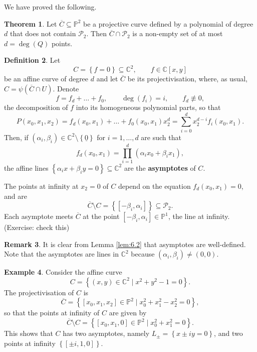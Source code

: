 \documentclass{article}
\newcommand{\C}{\mathbb{C}}
\renewcommand{\P}{\mathbb{P}}
\newcommand{\rb}[1]{\left( #1 \right)}
\renewcommand{\sb}[1]{\left[ #1 \right]}
\newcommand{\cb}[1]{\left\{ #1 \right\}}
\theoremstyle{definition}\newtheorem{definition}{Definition}[section]
\theoremstyle{definition}\newtheorem{notation}[definition]{Notation}
\theoremstyle{definition}\newtheorem{remark}[definition]{Remark}
\theoremstyle{definition}\newtheorem{example1}[definition]{Example}
\theoremstyle{definition}\newtheorem{fact}{Fact}
\theoremstyle{definition}\newtheorem{exercise}{Exercise}
\theoremstyle{definition}\newtheorem*{example2}{Example}
\newtheorem{theorem}[definition]{Theorem}
\begin{document}
We have proved the following.

\begin{theorem}
Let $ \overline{C} \subseteq \P^2 $ be a projective curve defined by a polynomial of degree $ d $ that does not contain $ \mathcal{P}_2 $. Then $ \overline{C} \cap \mathcal{P}_2 $ is a non-empty set of at most $ d = \deg\rb{Q} $ points.
\end{theorem}

\begin{definition}
Let
$$ C = \cb{f = 0} \subseteq \C^2, \qquad f \in \C\sb{x, y} $$
be an affine curve of degree $ d $ and let $ \overline{C} $ be its projectivisation, where, as usual, $ C = \psi\rb{\overline{C} \cap U} $. Denote
$$ f = f_d + \dots + f_0, \qquad \deg\rb{f_i} = i, \qquad f_d \not\equiv 0, $$
the decomposition of $ f $ into its homogeneous polynomial parts, so that
$$ P\rb{x_0, x_1, x_2} = f_d\rb{x_0, x_1} + \dots + f_0\rb{x_0, x_1}x_2^d = \sum_{i = 0}^d x_2^{d - i}f_i\rb{x_0, x_1}. $$
Then, if $ \rb{\alpha_i, \beta_i} \in \C^2 \setminus \cb{\underline{0}} $ for $ i = 1, \dots, d $ are such that
$$ f_d\rb{x_0, x_1} = \prod_{i = 1}^d \rb{\alpha_ix_0 + \beta_ix_1}, $$
the affine lines $ \cb{\alpha_ix + \beta_iy = 0} \subseteq \C^2 $ are the \textbf{asymptotes} of $ C $.
\end{definition}

The points at infinity at $ x_2 = 0 $ of $ C $ depend on the equation $ f_d\rb{x_0, x_1} = 0 $, and are
$$ \overline{C} \setminus C = \cb{\sb{-\beta_i, \alpha_i}} \subseteq \mathcal{P}_2. $$
Each asymptote meets $ \overline{C} $ at the point $ \sb{-\beta_i, \alpha_i} \in \P^1 $, the line at infinity. (Exercise: check this)

\begin{remark}
It is clear from Lemma \ref{lem:6.2} that asymptotes are well-defined. Note that the asymptotes are lines in $ \C^2 $ because $ \rb{\alpha_i, \beta_i} \ne \rb{0, 0} $.
\end{remark}

\begin{example1}
Consider the affine curve
$$ C = \cb{\rb{x, y} \in \C^2 \mid x^2 + y^2 - 1 = 0}. $$
The projectivisation of $ C $ is
$$ \overline{C} = \cb{\sb{x_0, x_1, x_2} \in \P^2 \mid x_0^2 + x_1^2 - x_2^2 = 0}, $$
so that the points at infinity of $ C $ are given by
$$ \overline{C} \setminus C = \cb{\sb{x_0, x_1, 0} \in \P^2 \mid x_0^2 + x_1^2 = 0}. $$
This shows that $ C $ has two asymptotes, namely $ L_\pm = \cb{x \pm iy = 0} $, and two points at infinity $ \cb{\sb{\pm i, 1, 0}} $.
\end{example1}
\end{document}
